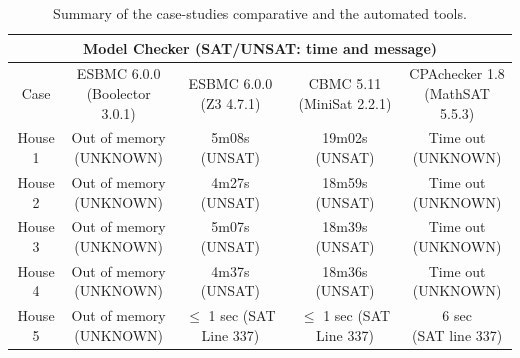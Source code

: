 \documentclass[review]{elsarticle}
\begin{document}
\begin{table}
\centering
\caption{Summary of the case-studies comparative and the automated tools.}\label{cases}
\begin{scriptsize}
\begin{tabular}{|c|c|c|c|c|}
\hline
\hline
\multicolumn{5}{|c|}{Model Checker (SAT/UNSAT: time and message)}\\
\hline
Case &  \makecell{ESBMC 6.0.0\\(Boolector 3.0.1)} & \makecell {ESBMC 6.0.0\\(Z3 4.7.1)} & \makecell{CBMC 5.11\\(MiniSat 2.2.1)} & \makecell{CPAchecker 1.8\\(MathSAT 5.5.3)}\\
\hline
\hline
House 1 &  \makecell{Out of memory \\(UNKNOWN)} & \makecell{5m08s \\(UNSAT)} & \makecell{19m02s \\(UNSAT)} & \makecell{Time out \\ (UNKNOWN)}\\
\hline
House 2 &  \makecell{Out of memory \\(UNKNOWN)} & \makecell{4m27s \\(UNSAT)} & \makecell{18m59s \\(UNSAT)} & \makecell{Time out \\ (UNKNOWN)}\\
\hline
House 3 &  \makecell{Out of memory \\(UNKNOWN)} & \makecell{5m07s \\(UNSAT)} & \makecell{18m39s \\(UNSAT)} & \makecell{Time out \\ (UNKNOWN)}\\
\hline
House 4 &  \makecell{Out of memory \\(UNKNOWN)} & \makecell{4m37s \\(UNSAT)} & \makecell{18m36s \\(UNSAT)} & \makecell{Time out \\ (UNKNOWN)}\\
\hline
House 5 &  \makecell{Out of memory \\(UNKNOWN)} & \makecell{$\leq$ 1 sec \\(SAT Line 337)} & \makecell{$\leq$ 1 sec \\(SAT Line 337)} & \makecell{6 sec \\ (SAT line 337)}\\
\hline
\hline
\end{tabular}
\end{scriptsize}
\end{table}
\end{document}
